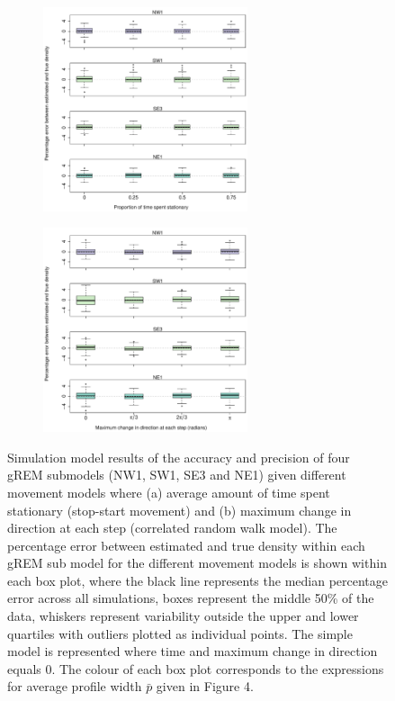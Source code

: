 \documentclass[a4paper,10pt,reqno,oneside]{amsart}
\begin{document}
\begin{figure}[t]
	\centering
	\begin{subfigure}[t]{60mm}
      		\centering
		\includegraphics[width=60mm]{imgs/ResultsPerch.pdf}
		\caption{} 
         	 \label{f:Perch}
	\end{subfigure}
	
	\begin{subfigure}[t]{60mm}
                \centering
		\includegraphics[width=60mm]{imgs/ResultsTort.pdf}
                \caption{} 
                \label{f:Tort}
         \end{subfigure}
	\label{f:BreakAssump}
	\caption{
	Simulation model results of the accuracy and precision of four gREM submodels (NW1, SW1, SE3 and NE1) given different movement models where (a) average amount of time spent stationary (stop-start movement) and (b) maximum change in direction at each step (correlated random walk model). The percentage error between estimated and true density within each gREM sub model for the different movement models is shown within each box plot, where the black line represents the median percentage error across all simulations, boxes represent the middle 50\% of the data, whiskers represent variability outside the upper and lower quartiles with outliers plotted as individual points. The simple model is represented where time and maximum change in direction equals 0. The colour of each box plot corresponds to the expressions for average profile width $\bar{p}$ given in Figure 4.} 
\end{figure}
\end{document}
